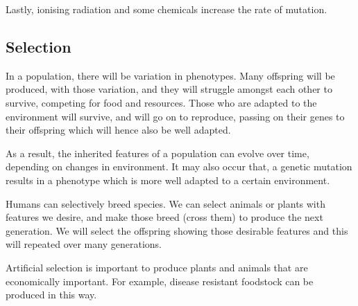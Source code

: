 Lastly, ionising radiation and some chemicals increase the rate of mutation.

\subsection{Selection}

In a population, there will be variation in phenotypes. Many offspring will be produced, with those
variation, and they will struggle amongst each other to survive, competing for food and resources.
Those who are adapted to the environment will survive, and will go on to reproduce, passing on 
their genes to their offspring which will hence also be well adapted.

As a result, the inherited features of a population can evolve over time, depending on changes in
environment. It may also occur that, a genetic mutation results in a phenotype which is more well
adapted to a certain environment.

Humans can selectively breed species. We can select animals or plants with features we desire, and
make those breed (cross them) to produce the next generation. We will select the offspring showing
those desirable features and this will repeated over many generations.

Artificial selection is important to produce plants and animals that are economically important. For
example, disease resistant foodstock can be produced in this way.
